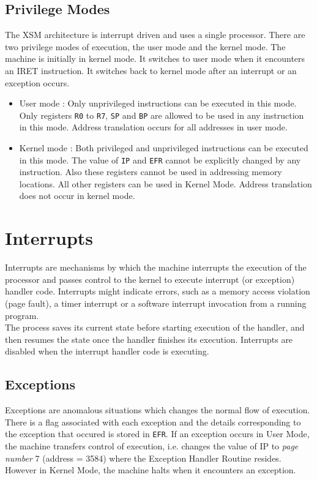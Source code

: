 \documentclass[11pt]{report}
\begin{document}
\section{Privilege Modes}
\label{sec:priv_modes}
The XSM architecture is interrupt driven and uses a single processor. There are two privilege modes of execution, the user mode and the kernel mode. The machine is initially in kernel mode. It switches to user mode when it encounters an IRET instruction. It switches back to kernel mode after an interrupt or an exception occurs.


\begin{itemize}
\item User mode : Only unprivileged instructions can be executed in this mode. Only registers \texttt{R0} to \texttt{R7}, \texttt{SP} and \texttt{BP} are allowed to be used in any instruction in this mode. Address translation occurs for all addresses in user mode.

\item Kernel mode : Both privileged and unprivileged instructions can be executed in this mode. The value of \texttt{IP} and \texttt{EFR} cannot be explicitly changed by any instruction. Also these registers cannot be used in addressing memory locations. All other registers can be used in Kernel Mode. Address translation does not occur in kernel mode. 


\end{itemize}

\chapter{Interrupts}
\label{sec:int}

Interrupts are mechanisms by which the machine interrupts the execution of the processor and passes control to the kernel to execute interrupt (or exception) handler code. Interrupts might indicate errors, such as a memory access violation (page fault), a timer interrupt or a software interrupt invocation from a running program. \\

The process saves its current state before starting execution of the handler, and then resumes the state once the handler finishes its execution. Interrupts are disabled when the interrupt handler code is executing. 


\section{Exceptions}
\label{excpetion}
Exceptions are anomalous situations which changes the normal flow of execution. There is a flag associated with each exception and the details corresponding to the exception that occured is stored in \texttt{EFR}. If an exception occurs in User Mode, the machine transfers control of execution, i.e. changes the value of IP to \textit{page number} 7 (address = 3584) where the Exception Handler Routine resides. However in Kernel Mode, the machine halts when it encounters an exception. \\
\end{document}
